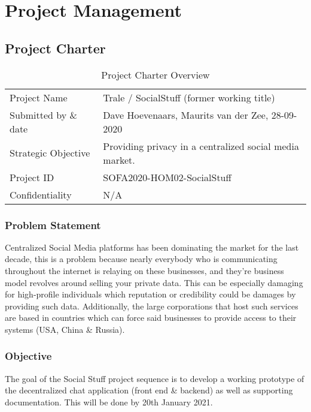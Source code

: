 

\chapter{Project Management}\label{ch:project-management}


\section{Project Charter}\label{sec:project-charter}

\begin{table}[]
    \begin{tabular}{ll}
        Project Name & Trale / SocialStuff (former working title) \\
        Submitted by \& date & Dave Hoevenaars, Maurits van der Zee, 28-09-2020 \\
        Strategic Objective & Providing privacy in a centralized social media market. \\
        Project ID & SOFA2020-HOM02-SocialStuff \\
        Confidentiality & N/A
    \end{tabular}
    \caption{Project Charter Overview}
    \label{tab:my-table}
\end{table}

\subsection{Problem Statement}\label{subsec:problem-statement}

Centralized Social Media platforms has been dominating the market for the last decade, this is a problem because nearly
everybody who is communicating throughout the internet is relaying on these businesses, and they’re business model
revolves around selling your private data.
This can be especially damaging for high-profile individuals which reputation or credibility could be damages by
providing such data.
Additionally, the large corporations that host such services are based in countries which can force said businesses to
provide access to their systems (USA, China \& Russia).

\subsection{Objective}\label{subsec:objective}

The goal of the Social Stuff project sequence is to develop a working prototype of the decentralized chat application
(front end \& backend) as well as supporting documentation.
This will be done by 20th January 2021.

